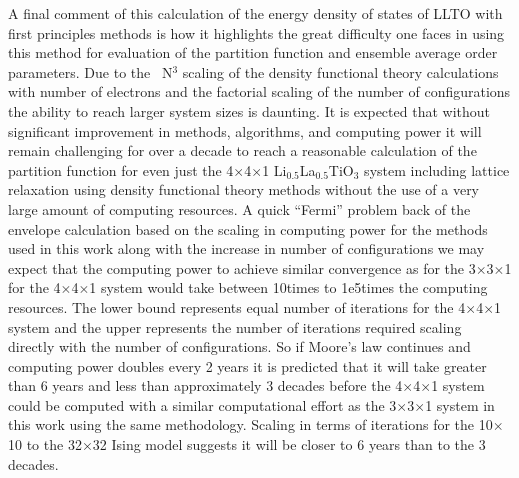 \documentclass[aps,pre,reprint,superscriptaddress,showkeys]{revtex4-2}
\begin{document}
A final comment of this calculation of the energy density of states of LLTO with first principles methods is how it highlights the great difficulty one faces in using this method for evaluation of the partition function and ensemble average order parameters. Due to the ~N$^3$ scaling of the density functional theory calculations with number of electrons and the factorial scaling of the number of configurations the ability to reach larger system sizes is daunting. It is expected that without significant improvement in methods, algorithms, and computing power it will remain challenging for over a decade to reach  a reasonable calculation of the partition function for even just the 4$\times$4$\times$1 Li$_{0.5}$La$_{0.5}$TiO$_3$ system including lattice relaxation using density functional theory methods without the use of a very large amount of computing resources. A quick ``Fermi'' problem back of the envelope calculation based on the scaling in computing power for the methods used in this work along with the increase in number of configurations we may expect that the computing  power to achieve similar convergence as for the 3$\times$3$\times$1 for the 4$\times$4$\times$1 system would take between 10times to 1e5times  the computing resources. The lower bound represents equal number of iterations for the 4$\times$4$\times$1 system and the upper represents the number of iterations required scaling directly with the number of configurations.  So if Moore's law continues and computing power doubles every 2 years it is predicted that it will take greater than 6 years and less than approximately 3 decades before the 4$\times$4$\times$1 system could be computed with a similar computational effort as the 3$\times$3$\times$1 system in this work using the same methodology. Scaling in terms of iterations for the  10$\times$10  to the 32$\times$32 Ising model suggests it will be closer to 6 years than to the 3 decades. 
\end{document}
